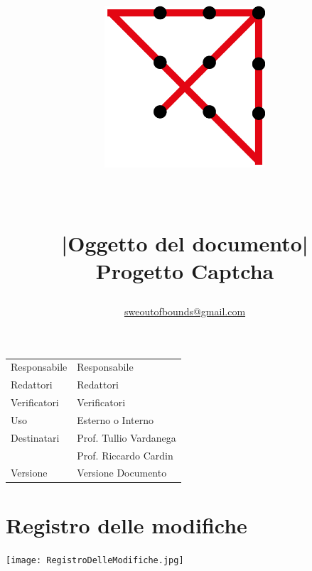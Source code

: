 \documentclass[a4paper, 10pt]{article}
\date{}
\title{
\includegraphics[width=6cm]{OutOfBoundsLogo.png}\\ 
\hfill \\ 
\hfill \\ 
\Large |Oggetto del documento| \\ 
\Huge Progetto Captcha\\
\Large \author{\href{mailto:sweoutofbounds@gmail.com}{sweoutofbounds@gmail.com}}
}
\begin{document}
    \maketitle
    \begin{Large}
    \begin{tabular}{ R{5cm} | p{5cm} } 
        Responsabile & Responsabile\\ 
        Redattori & Redattori\\ 
        Verificatori & Verificatori\\
        Uso & Esterno o Interno\\
        Destinatari & Prof. Tullio Vardanega\\
        \hfill & Prof. Riccardo Cardin\\
        Versione & Versione Documento
    \end{tabular}
    \end{Large}
    \newpage
    \tableofcontents
    \newpage
    \section{Registro delle modifiche}
    \begin{center}
        \texttt{[image: RegistroDelleModifiche.jpg]} 
    \end{center}
\end{document}
